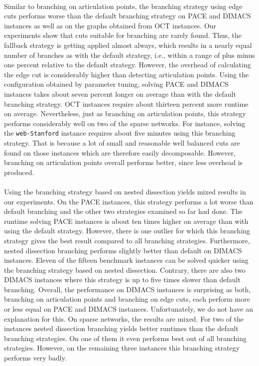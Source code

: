 \documentclass[12pt,a4paper,twoside]{scrartcl}
\numberwithin{equation}{section}
\begin{document}
\paragraph{}
Similar to branching on articulation points, the branching strategy using edge cuts performs worse than the default branching strategy on PACE and DIMACS instances as well as on the graphs obtained from OCT instances. Our experiments show that cuts suitable for branching are rarely found. Thus, the fallback strategy is getting applied almost always, which results in a nearly equal number of branches as with the default strategy, i.e., within a range of plus minus one percent relative to the default strategy. However, the overhead of calculating the edge cut is considerably higher than detecting articulation points. Using the configuration obtained by parameter tuning, solving PACE and DIMACS instances takes about seven percent longer on average than with the default branching strategy. OCT instances require about thirteen percent more runtime on average. Nevertheless, just as branching on articulation points, this strategy performs considerably well on two of the sparse networks. For instance, solving the \texttt{web-Stanford} instance requires about five minutes using this branching strategy. That is because a lot of small and reasonable well balanced cuts are found on those instances which are therefore easily decomposable. However, branching on articulation points overall performs better, since less overhead is produced.
\paragraph{}

Using the branching strategy based on nested dissection yields mixed results in our experiments. On the PACE instances, this strategy performs a lot worse than default branching and the other two strategies examined so far had done. The runtime solving PACE instances is about ten times higher on average than with using the default strategy. However, there is one outlier for which this branching strategy gives the best result compared to all branching strategies. Furthermore, nested dissection branching performs slightly better than default on DIMACS instances. Eleven of the fifteen benchmark instances can be solved quicker using the branching strategy based on nested dissection. Contrary, there are also two DIMACS instances where this strategy is up to five times slower than default branching. Overall, the performance on DIMACS instances is surprising as both, branching on articulation points and branching on edge cuts, each perform more or less equal on PACE and DIMACS instances. Unfortunately, we do not have an explanation for this. On sparse networks, the results are mixed. For two of the instances nested dissection branching yields better runtimes than the default branching strategies. On one of them it even performs best out of all branching strategies. However, on the remaining three instances this branching strategy performs very badly.
\end{document}
